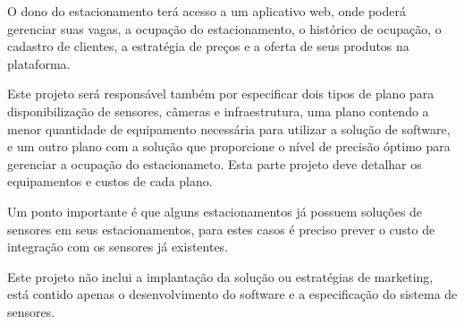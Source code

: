 O dono do estacionamento terá acesso a um aplicativo web, onde poderá gerenciar suas vagas, a ocupação do estacionamento, o histórico de ocupação, o cadastro de clientes, a estratégia de preços e a oferta de seus produtos na plataforma.

Este projeto será responsável também por especificar dois tipos de plano para disponibilização de sensores, câmeras e infraestrutura, uma plano contendo a menor quantidade de equipamento necessária para utilizar a solução de software, e um outro plano com a solução que proporcione o nível de precisão óptimo para gerenciar a ocupação do estacionameto. Esta parte projeto deve detalhar os equipamentos e custos de cada plano.

Um ponto importante é que alguns estacionamentos já possuem soluções de sensores em seus estacionamentos, para estes casos é preciso prever o custo de integração com os sensores já existentes.

Este projeto não inclui a implantação da solução ou estratégias de marketing, está contido apenas o desenvolvimento do software e a especificação do sistema de sensores.